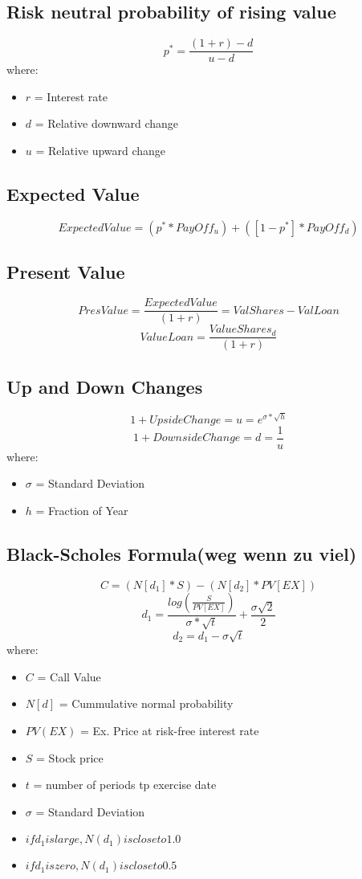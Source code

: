 \documentclass{cheatsheet}
\begin{document}
\subsection{Risk neutral probability of rising value}
\[p^{*} = \frac{(1+r) - d}{u-d}\]
\noindent where:
\begin{itemize}
  \item $r$ = Interest rate
  \item $d$ = Relative downward change
  \item $u$ = Relative upward change
\end{itemize}
\subsection{Expected Value}
\[Expected Value = (p^{*} * PayOff_u) + ([1 - p^{*}] * PayOff_d)\]
\subsection{Present Value}
\[Pres Value = \frac{Expected Value}{(1+r)} = ValShares - ValLoan\]
\[Value Loan = \frac{ValueShares_d}{(1+r)}\]
\subsection{Up and Down Changes}
\[1 + UpsideChange = u = e^{\sigma*\sqrt{h}}\]
\[1 + DownsideChange = d = \frac{1}{u}\]
\noindent where:
\begin{itemize}
  \item $\sigma$ = Standard Deviation
  \item $h$ = Fraction of Year
\end{itemize}
\subsection{Black-Scholes Formula(weg wenn zu viel)}
\[C = (N[d_1] * S) - (N[d_2] * PV[EX])\]
\[d_1 = \frac{log(\frac{S}{PV[EX]})}{\sigma *\sqrt{t}} + \frac{\sigma\sqrt{2}}{2}\]
\[d_2 = d_1 - \sigma\sqrt{t}\]
\noindent where:
\begin{itemize}
  \item $C$ = Call Value
  \item $N[d]$ = Cummulative normal probability
  \item $PV(EX)$ = Ex. Price at risk-free interest rate
  \item $S$ = Stock price
  \item $t$ = number of periods tp exercise date
  \item $\sigma$ = Standard Deviation 
  \item $if d_1 is large, N(d_1) is close to 1.0$
  \item $if d_1 is zero, N(d_1) is close to 0.5$
\end{itemize}
\end{document}
